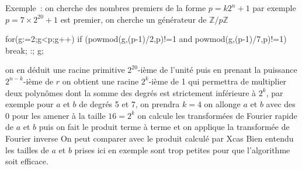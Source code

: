 \documentclass[a4paper,11pt]{book}
\begin{document}
\begin{giacjshere}
Exemple~: on cherche des nombres premiers de la forme $p=k2^n+1$
par exemple $p=7\times 2^{20}+1$ est premier, 
on cherche un g\'en\'erateur de $\mathbb{Z}/p\mathbb{Z}$
\begin{giacprog}
for(g:=2;g<p;g++){ 
  if (powmod(g,(p-1)/2,p)!=1 and powmod(g,(p-1)/7,p)!=1) break;
}:; g;
\end{giacprog}
on en d\'eduit une racine primitive $2^{20}$-i\`eme de l'unit\'e
puis en prenant la puissance $2^{n-k}$-i\`eme de $r$ on obtient une
racine $2^k$-i\`eme de 1 qui permettra de multiplier deux
polyn\^omes dont la somme des degr\'es est strictement 
inf\'erieure \`a $2^k$, par exemple pour $a$ et $b$ de
degr\'es 5 et 7, on prendra $k=4$
on allonge $a$ et $b$ avec des 0 pour les amener \`a la taille $16=2^k$
on calcule les transform\'ees de Fourier rapide de $a$ et $b$
puis on fait le produit terme \`a terme et on applique la transform\'ee
de Fourier inverse
On peut comparer avec le produit calcul\'e par Xcas
Bien entendu les tailles de $a$ et $b$ prises ici
en exemple sont trop petites
pour que l'algorithme soit efficace.


\end{giacjshere}
\end{document}
